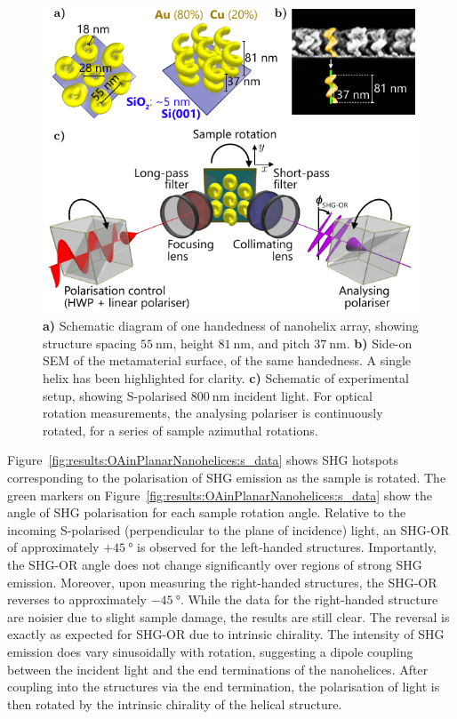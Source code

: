 \begin{figure}[htb!]	
    \centering	
    \includegraphics[scale=1.0]{./figures/results/OAinPlanarNanohelices/setup.pdf}
    \caption{\label{fig:results:OAinPlanarNanohelices:setup}
    \textbf{a)} Schematic diagram of one handedness of nanohelix array, showing structure spacing $\SI{55}{\nano\m}$, height $\SI{81}{\nano\m}$, and pitch $\SI{37}{\nano\m}$. \textbf{b)} Side-on SEM of the metamaterial surface, of the same handedness. A single helix has been highlighted for clarity. \textbf{c)} Schematic of experimental setup, showing S-polarised $\SI{800}{\nano\m}$ incident light. For optical rotation measurements, the analysing polariser is continuously rotated, for a series of sample azimuthal rotations.}	
\end{figure}

Figure~\ref{fig:results:OAinPlanarNanohelices:s_data} shows SHG hotspots corresponding to the polarisation of SHG emission as the sample is rotated. The green markers on Figure~\ref{fig:results:OAinPlanarNanohelices:s_data} show the angle of SHG polarisation for each sample rotation angle. Relative to the incoming S-polarised (perpendicular to the plane of incidence) light, an SHG-OR of approximately $+\SI{45}{\degree}$ is observed for the left-handed structures. Importantly, the SHG-OR angle does not change significantly over regions of strong SHG emission.
Moreover, upon measuring the right-handed structures, the SHG-OR reverses to approximately $-\SI{45}{\degree}$. While the data for the right-handed structure are noisier due to slight sample damage, the results are still clear. The reversal is exactly as expected for SHG-OR due to intrinsic chirality. The intensity of SHG emission does vary sinusoidally with rotation, suggesting a dipole coupling between the incident light and the end terminations of the nanohelices. After coupling into the structures via the end termination, the polarisation of light is then rotated by the intrinsic chirality of the helical structure.


